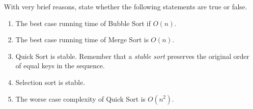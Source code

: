 With very brief reasons, state whether the following statements are
true or false.

\begin{enumerate}
\item  The best case running time of Bubble Sort if $O(n)$.
\item  The best case running time of Merge Sort is $O(n)$.
\item  Quick Sort is stable. Remember that a {\em stable sort}
preserves the original order of equal keys in the sequence.
\item  Selection sort is stable.
\item  The worse case complexity of Quick Sort is $O(n^2)$.
\end{enumerate}
